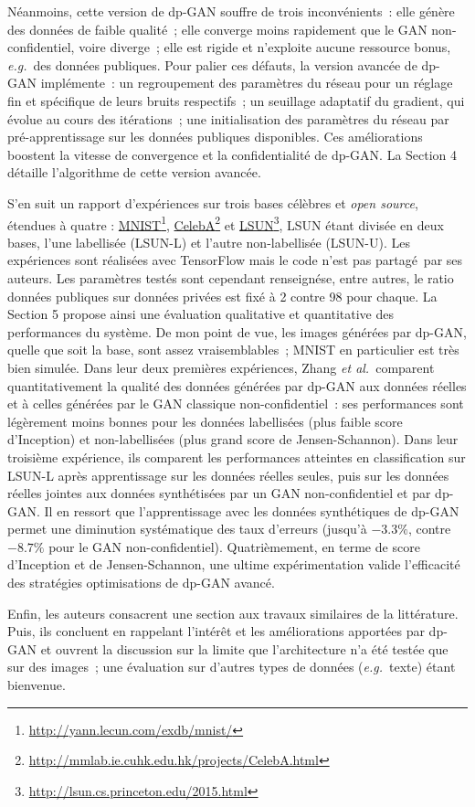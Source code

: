\documentclass[a4paper,11pt]{article}
\theoremstyle{definition}
\newcommand{\fnhref}[2]{\href{#1}{#2}\footnote{\url{#1}}}
\newcommand{\eg}{\textit{e.g.}}
\newcommand{\etal}{\textit{et al.}}
\begin{document}
\begin{multicols}{2}
Néanmoins, cette version de dp-GAN souffre de trois inconvénients : elle génère des données de faible qualité ; elle converge moins rapidement que le GAN non-confidentiel, voire diverge ; elle est rigide et n'exploite aucune ressource bonus, \eg\ des données publiques. Pour palier ces défauts, la version avancée de dp-GAN implémente : un regroupement des paramètres du réseau pour un réglage fin et spécifique de leurs bruits respectifs ; un seuillage adaptatif du gradient, qui évolue au cours des itérations ; une initialisation des paramètres du réseau par pré-apprentissage sur les données publiques disponibles. Ces améliorations boostent la vitesse de convergence et la confidentialité de dp-GAN. La Section 4 détaille l'algorithme de  cette version avancée.

S'en suit un rapport d'expériences sur trois bases célèbres et \textit{open source}, étendues à quatre : \fnhref{http://yann.lecun.com/exdb/mnist/}{MNIST}, \fnhref{http://mmlab.ie.cuhk.edu.hk/projects/CelebA.html}{CelebA} et \fnhref{http://lsun.cs.princeton.edu/2015.html}{LSUN}, LSUN étant divisée en deux bases, l'une labellisée (LSUN-L) et l'autre non-labellisée (LSUN-U). Les expériences sont réalisées avec TensorFlow mais le code n'est pas partagé par ses auteurs. Les paramètres testés sont cependant renseignése, entre autres, le ratio données publiques sur données privées est fixé à 2 contre 98 pour chaque. La Section 5 propose ainsi une évaluation qualitative et quantitative des performances du système. De mon point de vue, les images générées par dp-GAN, quelle que soit la base, sont assez vraisemblables ; MNIST en particulier est très bien simulée.
Dans leur deux premières expériences, Zhang \etal\ comparent quantitativement la qualité des données générées par dp-GAN aux données réelles et à celles générées par le GAN classique non-confidentiel : ses performances sont légèrement moins bonnes pour les données labellisées (plus faible score d'Inception) et non-labellisées (plus grand score de Jensen-Schannon). Dans leur troisième expérience, ils comparent les performances atteintes en classification sur LSUN-L après apprentissage sur les données réelles seules, puis sur les données réelles jointes aux données synthétisées par un GAN non-confidentiel et par dp-GAN. Il en ressort que l'apprentissage avec les données synthétiques de dp-GAN permet une diminution systématique des taux d'erreurs (jusqu'à $-3.3 \%$, contre $-8.7 \%$ pour le GAN non-confidentiel). Quatrièmement, en terme de score d'Inception et de Jensen-Schannon, une ultime expérimentation valide l'efficacité des stratégies optimisations de dp-GAN avancé.

Enfin, les auteurs consacrent une section aux travaux similaires de la littérature. Puis, ils concluent en rappelant l'intérêt et les améliorations apportées par dp-GAN et ouvrent la discussion sur la limite que l'architecture n'a été testée que sur des images ; une évaluation sur d'autres types de données (\eg\ texte) étant bienvenue.
\end{multicols}
\end{document}
